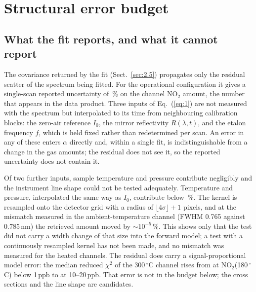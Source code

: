 \section{Structural error budget}
\label{sec:4}

\subsection{What the fit reports, and what it cannot report}
\label{sec:4.1}

The covariance returned by the fit (Sect.~\ref{sec:2.5}) propagates only the residual scatter of the spectrum being
fitted. For the operational configuration it gives a single-scan reported uncertainty of \,\% on the channel
NO$_2$ amount, the number that appears in the data product. Three inputs of Eq.~(\ref{eq:1}) are not measured with
the spectrum but interpolated to its time from neighbouring calibration blocks: the zero-air reference $I_0$, the
mirror reflectivity $R(\lambda,t)$, and the etalon frequency $f$, which is held fixed rather than redetermined per
scan. An error in any of these enters $\alpha$ directly and, within a single fit, is indistinguishable from a change
in the gas amounts; the residual does not see it, so the reported uncertainty does not contain it.

Of two further inputs, sample temperature and pressure contribute negligibly and the instrument line shape could not
be tested adequately. Temperature and pressure, interpolated the same way as $I_0$, contribute below \,\%. The kernel is resampled onto the
detector grid with a radius of $\lfloor 4\sigma \rfloor + 1$ pixels, and at the mismatch measured in the
ambient-temperature channel (FWHM 0.765 against 0.785\,nm) the retrieved amount moved by $\sim 10^{-5}$\,\%. This shows only
that the test did not carry a width change of that size into the forward model; a test with a continuously resampled kernel has not been made, and no mismatch was measured for
the heated channels. The residual does carry a signal-proportional model error: the median reduced $\chi^2$ of the
300\,$^{\circ}$C channel rises from  at NO$_2$(180\,$^{\circ}$C) below 1\,ppb to  at 10--20\,ppb. That error
is not in the budget below; the cross sections and the line shape are candidates.

